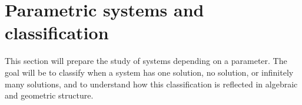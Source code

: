 \section{Parametric systems and classification}

This section will prepare the study of systems depending on a parameter. The goal will be to classify when a system has one solution, no solution, or infinitely many solutions, and to understand how this classification is reflected in algebraic and geometric structure.
